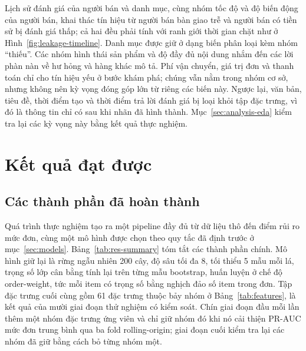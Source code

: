 \documentclass[12pt,a4paper]{report}
\begin{document}
Lịch sử đánh giá của người bán và danh mục, cùng nhóm tốc độ và độ biến động của người bán, khai thác tín hiệu từ người bán bàn giao trễ và người bán có tiền sử bị đánh giá thấp; cả hai đều phải tính với ranh giới thời gian chặt như ở Hình~\ref{fig:leakage-timeline}. Danh mục được giữ ở dạng biến phân loại kèm nhóm ``thiếu''. Các nhóm hình thái sản phẩm và độ đầy đủ nội dung nhắm đến các lời phàn nàn về hư hỏng và hàng khác mô tả. Phí vận chuyển, giá trị đơn và thanh toán chỉ cho tín hiệu yếu ở bước khám phá; chúng vẫn nằm trong nhóm cơ sở, nhưng không nên kỳ vọng đóng góp lớn từ riêng các biến này. Ngược lại, văn bản, tiêu đề, thời điểm tạo và thời điểm trả lời đánh giá bị loại khỏi tập đặc trưng, vì đó là thông tin chỉ có sau khi nhãn đã hình thành. Mục~\ref{sec:analysis-eda} kiểm tra lại các kỳ vọng này bằng kết quả thực nghiệm.

\section{Kết quả đạt được}\label{sec:results}

\subsection{Các thành phần đã hoàn thành}\label{subsec:res-summary}

Quá trình thực nghiệm tạo ra một pipeline đầy đủ từ dữ liệu thô đến điểm rủi ro mức đơn, cùng một mô hình được chọn theo quy tắc đã định trước ở mục~\ref{sec:models}. Bảng~\ref{tab:res-summary} tóm tắt các thành phần chính. Mô hình giữ lại là rừng ngẫu nhiên 200 cây, độ sâu tối đa 8, tối thiểu 5 mẫu mỗi lá, trọng số lớp cân bằng tính lại trên từng mẫu bootstrap, huấn luyện ở chế độ order-weight, tức mỗi item có trọng số bằng nghịch đảo số item trong đơn. Tập đặc trưng cuối cùng gồm 61 đặc trưng thuộc bảy nhóm ở Bảng~\ref{tab:features}, là kết quả của mười giai đoạn thử nghiệm có kiểm soát. Chín giai đoạn đầu mỗi lần thêm một nhóm đặc trưng ứng viên và chỉ giữ nhóm đó khi nó cải thiện PR-AUC mức đơn trung bình qua ba fold rolling-origin; giai đoạn cuối kiểm tra lại các nhóm đã giữ bằng cách bỏ từng nhóm một.
\end{document}
